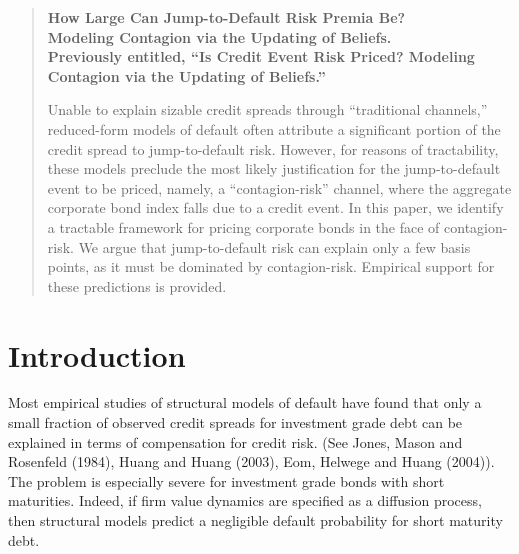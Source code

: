 \documentclass[titlepage,11pt]{article}
\begin{document}
\date{First Version: January 28, 2002 \\
This Version:  December 20, 2008 \vspace{.6 in}\\
}

\maketitle

\begin{abstract}

\begin{center}
{\bf \Large{How Large Can Jump-to-Default Risk Premia Be?\\
Modeling Contagion via the Updating of Beliefs.\\
{\tiny Previously entitled, ``Is Credit Event Risk Priced?
Modeling Contagion via the Updating of Beliefs.''}}}
\end{center}

Unable to explain sizable credit spreads through ``traditional
channels,'' reduced-form models of default often attribute a
significant portion of the credit spread to jump-to-default risk.
However, for reasons of tractability, these models preclude the most
likely justification for the jump-to-default event to be priced,
namely, a ``contagion-risk'' channel, where the aggregate corporate
bond index falls due to a credit event.  In this paper, we identify
a tractable framework for pricing corporate bonds in the face of
contagion-risk.  We argue that jump-to-default risk can explain only
a few basis points, as it must be dominated by contagion-risk.
Empirical support for these predictions is provided.

\end{abstract}

\newpage


\section{Introduction}

Most empirical studies of structural models of default have found
that only a small fraction of observed credit spreads for investment
grade debt can be explained in terms of compensation for credit
risk. (See Jones, Mason and Rosenfeld (1984), Huang and Huang
(2003), Eom, Helwege and Huang (2004)).
\nocite{jonmas84}\nocite{eomhel04}\nocite{huahua03} The problem is
especially severe for investment grade bonds with short maturities.
Indeed, if firm value dynamics are specified as a diffusion process,
then structural models predict a negligible default probability for
short maturity debt.
\end{document}
